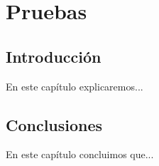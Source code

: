 \chapter{Pruebas}\label{cap:pruebas}

\section{Introducción}
En este capítulo explicaremos...

\section{Conclusiones}
En este capítulo concluimos que...